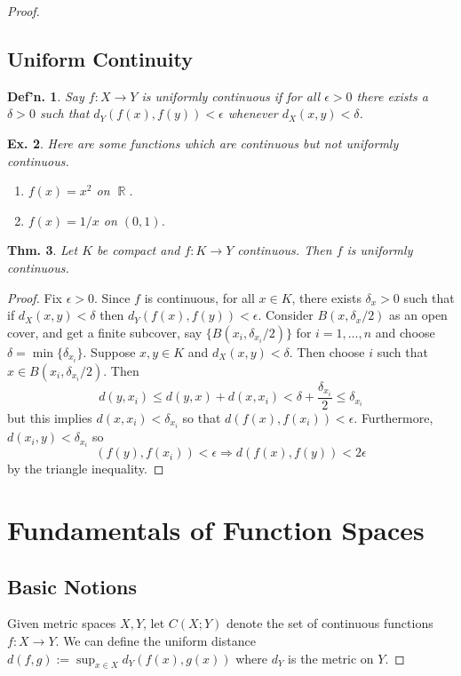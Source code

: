 \documentclass[12pt, a4paper]{book}
\DeclareMathOperator{\R}{\mathbb{R}}
\newtheorem{theorem}{Thm.}[section]
\newtheorem{definition}[theorem]{Def'n.}
\newtheorem{example}[theorem]{Ex.}
\theoremstyle{nonumberplain}
\newtheorem{proof}{Proof}
\begin{document}
\begin{proof}
\subsection{Uniform Continuity}
\begin{definition}
    Say $f:X\to Y$ is uniformly continuous if for all $\epsilon>0$ there exists a $\delta>0$ such that $d_Y(f(x),f(y))<\epsilon$
    whenever $d_X(x,y)<\delta$.
\end{definition}
\begin{example}
    Here are some functions which are continuous but not uniformly continuous.
    \begin{enumerate}
        \item $f(x)=x^2$ on $\R$.
        \item $f(x)=1/x$ on $(0,1)$.
    \end{enumerate}
\end{example}
\begin{theorem}
    Let $K$ be compact and $f:K\to Y$ continuous. Then $f$ is uniformly continuous.
\end{theorem}
\begin{proof}
    Fix $\epsilon>0$. Since $f$ is continuous, for all $x\in K$, there exists $\delta_x>0$ such that if $d_X(x,y)<\delta$
    then $d_Y(f(x),f(y))<\epsilon$. Consider $B(x,\delta_x/2)$ as an open cover, and get a finite subcover, say $\{B(x_i,\delta_{ x_i}/2)\}$
    for $i=1,\ldots,n$ and choose $\delta=\min\{\delta_{x_i}\}$. Suppose $x,y\in K$ and $d_X(x,y)<\delta$. Then choose $i$
    such that $x\in B(x_i,\delta_{x_i}/2)$. Then
    \[d(y,x_i)\leq d(y,x)+d(x,x_i)<\delta+\frac{\delta_{x_i}}{2}\leq\delta_{x_i}\]
    but this implies $d(x,x_i)<\delta_{x_i}$ so that $d(f(x),f(x_i))<\epsilon$. Furthermore, $d(x_i,y)<\delta_{x_i}$ so
    \[(f(y),f(x_i))<\epsilon\Rightarrow d(f(x),f(y))<2\epsilon\]
    by the triangle inequality.
\end{proof}



\section{Fundamentals of Function Spaces}
\subsection{Basic Notions}
Given metric spaces $X,Y$, let $C(X;Y)$ denote the set of continuous functions $f:X\to Y$.
We can define the uniform distance $d(f,g):=\sup_{x\in X}d_Y(f(x),g(x))$ where $d_Y$ is the metric on $Y$.


\end{proof}
\end{document}
